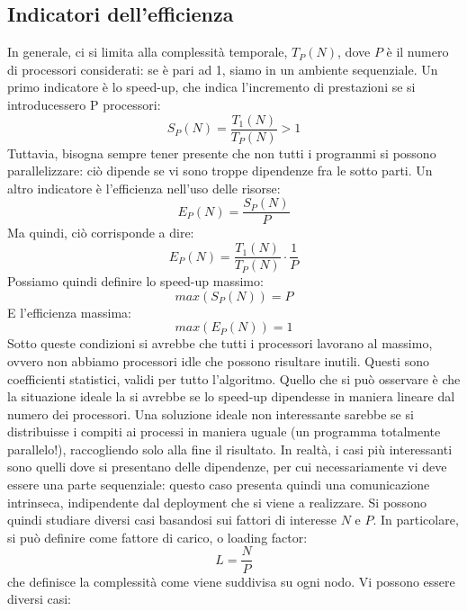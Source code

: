 \subsection{Indicatori dell'efficienza}
In generale, ci si limita alla complessità temporale, $T_P(N)$, dove $P$ è il numero di processori considerati: se è
pari ad 1, siamo in un ambiente sequenziale.
Un primo indicatore è lo speed-up, che indica l'incremento di prestazioni se si introducessero P processori:
\begin{equation}
S_P(N) = \frac{T_1(N)}{T_P(N)} > 1
\end{equation}
Tuttavia, bisogna sempre tener presente che non tutti i programmi si possono
parallelizzare: ciò dipende se vi sono troppe dipendenze fra le sotto parti.
Un altro indicatore è l'efficienza nell'uso delle risorse:
\begin{equation}
 E_P(N) = \frac{S_P(N)}{P}
\end{equation}
Ma quindi, ciò corrisponde a dire:
\begin{equation}
 E_P(N) = \frac{T_1(N)}{T_P(N)} \cdot \frac{1}{P}
\end{equation}
Possiamo quindi definire lo speed-up massimo:
\begin{equation}
 max(S_P(N)) = P
\end{equation}
E l'efficienza massima:
\begin{equation}
 max(E_P(N)) = 1
\end{equation}
Sotto queste condizioni si avrebbe che tutti i processori lavorano al massimo, ovvero non abbiamo processori idle che
possono risultare inutili. Questi sono coefficienti statistici, validi per tutto l'algoritmo. Quello che si può
osservare è che la situazione ideale la si avrebbe se lo speed-up dipendesse in maniera lineare dal numero dei
processori. Una soluzione ideale non interessante sarebbe se si distribuisse i compiti ai processi in maniera uguale (un
programma totalmente parallelo!), raccogliendo solo alla fine il risultato. In realtà, i casi più interessanti sono
quelli dove si presentano delle dipendenze, per cui necessariamente vi deve essere una parte sequenziale: questo caso
presenta quindi una comunicazione intrinseca, indipendente dal deployment che si viene a realizzare.
Si possono quindi studiare diversi casi basandosi sui fattori di interesse $N$ e $P$. In particolare, si può definire
come fattore di carico, o loading factor:
\begin{equation}
 L = \frac{N}{P}
\end{equation}
che definisce la complessità come viene suddivisa su ogni nodo. Vi possono essere diversi casi:
